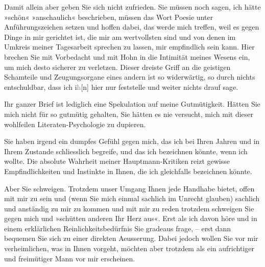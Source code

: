 \pstart
           Damit allein aber geben Sie sich nicht zufrieden. Sie müssen noch sagen, ich hätte
               »schön« »anschaulich« beschrieben, müssen das Wort Poesie unter Anführungszeichen
               setzen und hoffen dabei, das werde mich treffen, weil es gegen Dinge in mir gerichtet
               ist, die mir am wertvollsten sind und von denen im Umkreis meiner Tagesarbeit
               sprechen zu lassen, mir empfindlich sein kann. {\pb}Hier brechen Sie mit Vorbedacht
               und mit Hohn in die Intimität meines Wesens ein, um mich desto sicherer zu verletzen.
               Dieser dreiste Griff an die geistigen Schamteile und Zeugungsorgane eines andern ist
               so widerwärtig, so durch nichts entschuldbar, dass ich i\textcolor{gray}{h}{[}n{]} hier nur feststelle und weiter nichts drauf sage.\pend
           
\pstart
           Ihr ganzer Brief ist lediglich eine Spekulation auf meine Gutmütigkeit. Hätten Sie
               mich nicht für so gutmütig gehalten, Sie hätten es nie versucht, mich mit dieser
               wohlfeilen Literaten-Psychologie zu dupieren.\pend
           
\pstart
           Sie haben irgend ein dumpfes Gefühl gegen mich, das ich bei Ihren Jahren und in Ihrem
               Zustande schliesslich begreife, und das ich bezeichnen könnte, wenn ich wollte. Die
               absolute Wahrheit meiner Hauptmann-Kritiken reizt gewisse
               Empfindlichkeiten und Instinkte in Ihnen, die ich gleichfalls bezeichnen könnte.\pend
           
\pstart
           Aber Sie schweigen. Trotzdem unser Umgang Ihnen jede Handhabe bietet, offen mit mir
               zu sein und (wenn Sie mich einmal sachlich im Unrecht glauben) sachlich und anständig
               zu mir zu kommen und mit mir zu reden {\dotstwo} trotzdem schweigen
               Sie gegen mich und »schütten anderen Ihr Herz aus«. Erst als ich davon höre und in
               einem erklärlichen Reinlichkeitsbedürfnis Sie gradeaus frage, – erst dann bequemen
               Sie sich zu einer direkten Aeusserung. Dabei jedoch wollen Sie vor mir verheimlichen,
               was in Ihnen vorgeht, möchten aber trotzdem als ein aufrichtiger und freimütiger Mann
               vor mir erscheinen.\pend
           
